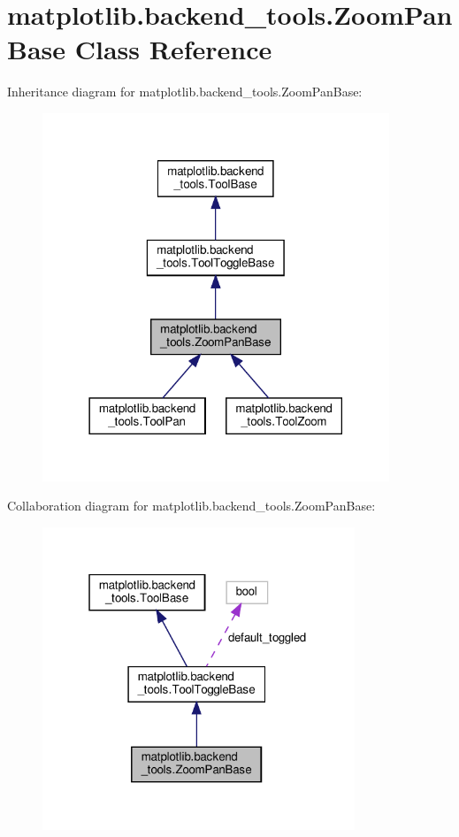 \hypertarget{classmatplotlib_1_1backend__tools_1_1ZoomPanBase}{}\section{matplotlib.\+backend\+\_\+tools.\+Zoom\+Pan\+Base Class Reference}
\label{classmatplotlib_1_1backend__tools_1_1ZoomPanBase}


Inheritance diagram for matplotlib.\+backend\+\_\+tools.\+Zoom\+Pan\+Base\+:
\nopagebreak
\begin{figure}[H]
\begin{center}
\leavevmode
\includegraphics[width=294pt]{classmatplotlib_1_1backend__tools_1_1ZoomPanBase__inherit__graph}
\end{center}
\end{figure}


Collaboration diagram for matplotlib.\+backend\+\_\+tools.\+Zoom\+Pan\+Base\+:
\nopagebreak
\begin{figure}[H]
\begin{center}
\leavevmode
\includegraphics[width=265pt]{classmatplotlib_1_1backend__tools_1_1ZoomPanBase__coll__graph}
\end{center}
\end{figure}
